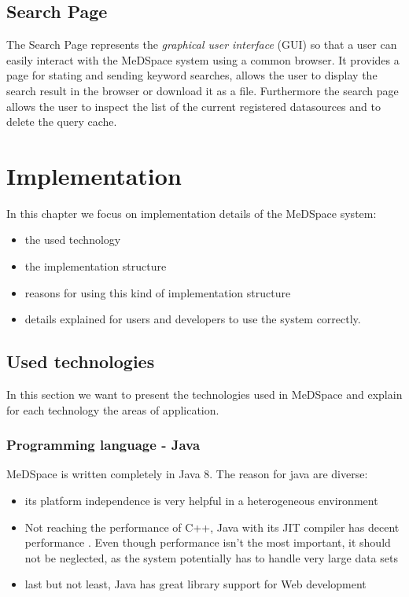 \section{Search Page}
The Search Page represents the \emph{graphical user interface} (GUI) so that a user can easily interact with the MeDSpace system using a common browser. It provides a page for stating and sending keyword searches, allows the user to display the search result in the browser or download it as a file. Furthermore the search page allows the user to inspect the list of the current registered datasources and to delete the query cache.

\chapter{Implementation}
In this chapter we focus on implementation details of the MeDSpace system: 

\begin{itemize}
\item the used technology
\item the implementation structure
\item reasons for using this kind of    
   implementation structure
\item details explained for users and developers to 
   use the system correctly. 
\end{itemize}

\section{Used technologies}

In this section we want to present the technologies used in MeDSpace and explain for each technology the areas of application.

\subsection{Programming language - Java}
MeDSpace is written completely in Java 8. The reason for java are diverse: 
\begin{itemize}
\item its platform independence is very helpful in a heterogeneous environment
\item Not reaching the performance of C++, Java with its JIT compiler has decent performance \cite[p. 425]{TABOADA2013425}. Even though performance isn't the most important, it should not be 
  neglected, as the system potentially has to handle very large data sets
\item last but not least, Java has great library support for Web development
\end{itemize}

